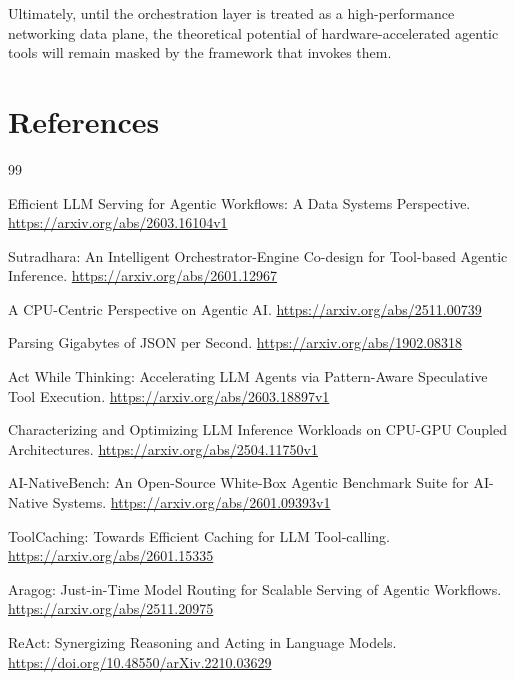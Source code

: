 \documentclass[10pt, letterpaper]{article}
\begin{document}
\noindent Ultimately, until the orchestration layer is treated as a high-performance networking data plane, the theoretical potential of hardware-accelerated agentic tools will remain masked by the framework that invokes them.

\section{References}

\begingroup
\renewcommand{\section}[2]{}%
\begin{thebibliography}{99}

Efficient LLM Serving for Agentic Workflows: A Data Systems Perspective.
\url{https://arxiv.org/abs/2603.16104v1}

Sutradhara: An Intelligent Orchestrator-Engine Co-design for Tool-based Agentic Inference.
\url{https://arxiv.org/abs/2601.12967}

A CPU-Centric Perspective on Agentic AI.
\url{https://arxiv.org/abs/2511.00739}

Parsing Gigabytes of JSON per Second.
\url{https://arxiv.org/abs/1902.08318}

Act While Thinking: Accelerating LLM Agents via Pattern-Aware Speculative Tool Execution.
\url{https://arxiv.org/abs/2603.18897v1}

Characterizing and Optimizing LLM Inference Workloads on CPU-GPU Coupled Architectures.
\url{https://arxiv.org/abs/2504.11750v1}

AI-NativeBench: An Open-Source White-Box Agentic Benchmark Suite for AI-Native Systems.
\url{https://arxiv.org/abs/2601.09393v1}

ToolCaching: Towards Efficient Caching for LLM Tool-calling.
\url{https://arxiv.org/abs/2601.15335}

Aragog: Just-in-Time Model Routing for Scalable Serving of Agentic Workflows.
\url{https://arxiv.org/abs/2511.20975}

ReAct: Synergizing Reasoning and Acting in Language Models.
\url{https://doi.org/10.48550/arXiv.2210.03629}

\end{thebibliography}
\endgroup
\end{document}
